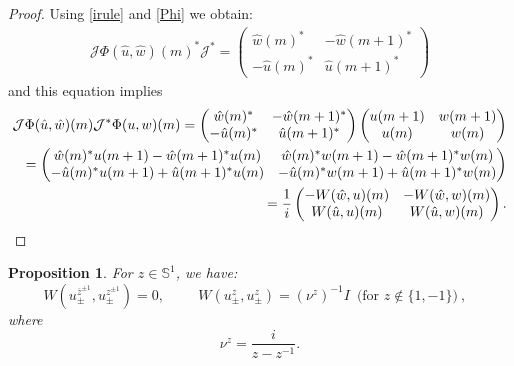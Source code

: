 \documentclass[12pt,oneside,onecolumn,open]{article}
\newtheorem{propo}[teo]{Proposition}
\begin{document}
\begin{proof}
    Using \eqref{irule} and \eqref{Phi}  we obtain:
    \begin{align}
      \mathcal{J}\Phi (\hat{u}, \hat{w})(m)^*\mathcal{J}^{*}=
      \begin{pmatrix}
          \hat{w}(m)^{*}&-\hat{w}(m+1)^{*}\\
          -\hat{u}(m)^{*}&\hat{u}(m+1)^{*}
      \end{pmatrix}
    \end{align} and this equation implies
    \begin{align}
        \mathcal{J}\Phi (\hat{u}, \hat{w})(m)\mathcal{J}^{*}\Phi (u,w)(m)=
       \begin{pmatrix}
          \hat{w}(m)^{*}&-\hat{w}(m +1 )^{*}\\ \notag
          -\hat{u}(m)^{*}&\hat{u}(m + 1)^{*}
      \end{pmatrix}
        \begin{pmatrix}
            u(m+1)&w(m+1)\\
            u(m)&w(m)
        \end{pmatrix}\\ 
        =\begin{pmatrix}
           \hat{w}(m)^{*} u(m+1)-\hat{w}(m+1)^{*}u(m)&\hat{w}(m)^{*}w(m+1)-\hat{w}(m+1)^{*}w(m)\\
           -\hat{u}(m)^{*}u(m+1)+\hat{u}(m+1)^{*}u(m)&
           -\hat{u}(m)^{*}w(m+1)+\hat{u}(m+1)^{*}w(m)
        \end{pmatrix}\\
        =\frac{1}{i}
             \begin{pmatrix}
            -W(\hat{w}, u)(m) & -W(\hat{w}, w)(m) \\
            W(\hat{u}, u)(m) & W(\hat{u}, w)(m)
        \end{pmatrix}.
       \end{align}
       
\end{proof}
 \begin{propo}\label{y5}
For $z \in \mathbb{S}^{1}$, we have:
 \begin{equation}
 \label{nu}
W(u_{\pm}^{\overline{z}^{\pm 1}}, u_{\pm }^{z^{\pm 1}})=0, \hspace{1cm} W(u_{\pm}^{z}, u_{\pm }^{z})=(\nu ^{z})^{-1}I     \,\,\,  \text{(for $z \notin \{ 1, -1 \} $)}\:   , \: \: \: 
 \end{equation}
 where
 \begin{equation}\label{nu2}
     \nu ^{z}=\frac{i}{z-z^{-1}}.
 \end{equation}

\end{propo}
\end{document}
